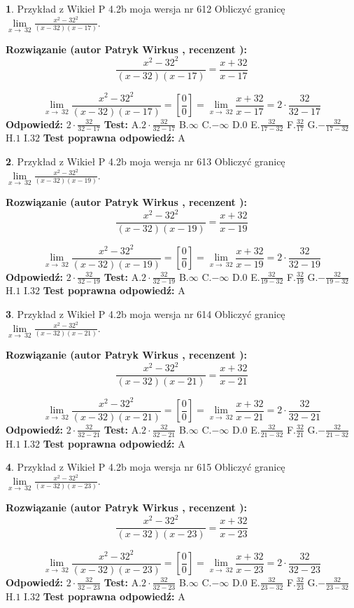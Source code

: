 \documentclass[12pt, a4paper]{article}
\theoremstyle{definition} %
\newtheorem{zad}{}
\newcommand{\zadStart}[1]{\begin{zad}#1\newline}
\newcommand{\zadStop}{\end{zad}}
\newcommand{\rozwStart}[2]{\noindent \textbf{Rozwiązanie (autor #1 , recenzent #2): }\newline}
\newcommand{\rozwStop}{\newline}
\newcommand{\odpStart}{\noindent \textbf{Odpowiedź:}\newline}
\newcommand{\odpStop}{\newline}
\newcommand{\testStart}{\noindent \textbf{Test:}\newline}
\newcommand{\testStop}{\newline}
\newcommand{\kluczStart}{\noindent \textbf{Test poprawna odpowiedź:}\newline}
\newcommand{\kluczStop}{\newline}
\begin{document}
\zadStart{Przykład z Wikieł P 4.2b moja wersja nr 612}
Obliczyć granicę $\lim\limits_{x\to\ 32}\frac{x^{2}-32^{2}}{(x-32)(x-17)}$.
\zadStop
\rozwStart{Patryk Wirkus}{}
$$\frac{x^{2}-32^{2}}{(x-32)(x-17)}=\frac{x+32}{x-17}$$

$$\lim\limits_{x\to\ 32}\frac{x^{2}-32^{2}}{(x-32)(x-17)}=[\frac{0}{0}]=\lim\limits_{x\to\ 32}\frac{x+32}{x-17}=2 \cdot \frac{32}{32-17}$$
\rozwStop
\odpStart
$2 \cdot \frac{32}{32-17}$
\odpStop
\testStart
A.$2 \cdot \frac{32}{32-17}$
B.$\infty$
C.$-\infty$
D.$0$
E.$\frac{32}{17-32}$
F.$\frac{32}{17}$
G.$-\frac{32}{17-32}$
H.$1$
I.$32$
\testStop
\kluczStart
A
\kluczStop



\zadStart{Przykład z Wikieł P 4.2b moja wersja nr 613}
Obliczyć granicę $\lim\limits_{x\to\ 32}\frac{x^{2}-32^{2}}{(x-32)(x-19)}$.
\zadStop
\rozwStart{Patryk Wirkus}{}
$$\frac{x^{2}-32^{2}}{(x-32)(x-19)}=\frac{x+32}{x-19}$$

$$\lim\limits_{x\to\ 32}\frac{x^{2}-32^{2}}{(x-32)(x-19)}=[\frac{0}{0}]=\lim\limits_{x\to\ 32}\frac{x+32}{x-19}=2 \cdot \frac{32}{32-19}$$
\rozwStop
\odpStart
$2 \cdot \frac{32}{32-19}$
\odpStop
\testStart
A.$2 \cdot \frac{32}{32-19}$
B.$\infty$
C.$-\infty$
D.$0$
E.$\frac{32}{19-32}$
F.$\frac{32}{19}$
G.$-\frac{32}{19-32}$
H.$1$
I.$32$
\testStop
\kluczStart
A
\kluczStop



\zadStart{Przykład z Wikieł P 4.2b moja wersja nr 614}
Obliczyć granicę $\lim\limits_{x\to\ 32}\frac{x^{2}-32^{2}}{(x-32)(x-21)}$.
\zadStop
\rozwStart{Patryk Wirkus}{}
$$\frac{x^{2}-32^{2}}{(x-32)(x-21)}=\frac{x+32}{x-21}$$

$$\lim\limits_{x\to\ 32}\frac{x^{2}-32^{2}}{(x-32)(x-21)}=[\frac{0}{0}]=\lim\limits_{x\to\ 32}\frac{x+32}{x-21}=2 \cdot \frac{32}{32-21}$$
\rozwStop
\odpStart
$2 \cdot \frac{32}{32-21}$
\odpStop
\testStart
A.$2 \cdot \frac{32}{32-21}$
B.$\infty$
C.$-\infty$
D.$0$
E.$\frac{32}{21-32}$
F.$\frac{32}{21}$
G.$-\frac{32}{21-32}$
H.$1$
I.$32$
\testStop
\kluczStart
A
\kluczStop



\zadStart{Przykład z Wikieł P 4.2b moja wersja nr 615}
Obliczyć granicę $\lim\limits_{x\to\ 32}\frac{x^{2}-32^{2}}{(x-32)(x-23)}$.
\zadStop
\rozwStart{Patryk Wirkus}{}
$$\frac{x^{2}-32^{2}}{(x-32)(x-23)}=\frac{x+32}{x-23}$$

$$\lim\limits_{x\to\ 32}\frac{x^{2}-32^{2}}{(x-32)(x-23)}=[\frac{0}{0}]=\lim\limits_{x\to\ 32}\frac{x+32}{x-23}=2 \cdot \frac{32}{32-23}$$
\rozwStop
\odpStart
$2 \cdot \frac{32}{32-23}$
\odpStop
\testStart
A.$2 \cdot \frac{32}{32-23}$
B.$\infty$
C.$-\infty$
D.$0$
E.$\frac{32}{23-32}$
F.$\frac{32}{23}$
G.$-\frac{32}{23-32}$
H.$1$
I.$32$
\testStop
\kluczStart
A
\kluczStop
\end{document}
